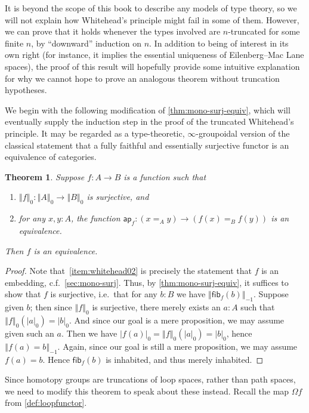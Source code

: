 \documentclass[10pt,a4paper]{article}
\providecommand{\index}[1]{}
\newcommand{\id}[3][]{\ensuremath{#2 =_{#1} #3}\xspace}
\newcommand{\mapfunc}[1]{\ensuremath{\mathsf{ap}_{#1}}\xspace} %
\let\apfunc\mapfunc
\newcommand{\hfib}[2]{{\mathsf{fib}}_{#1}(#2)}
\newcommand{\trunc}[2]{\mathopen{}\left\Vert #2\right\Vert_{#1}\mathclose{}}
\newcommand{\tproj}[3][]{\mathopen{}\left|#3\right|_{#2}^{#1}\mathclose{}}
\newtheorem{thm}{Theorem}[section]
\theoremstyle{definition}
\theoremstyle{remark}
\numberwithin{equation}{section}
\begin{document}
It is beyond the scope of this book to describe any models of type theory, so we will not explain how Whitehead's principle might fail in some of them.
However, we can prove that it holds whenever the types involved are $n$-truncated for some finite $n$, by ``downward'' induction on $n$.
In addition to being of interest in its own right (for instance, it implies the essential uniqueness of Eilenberg--Mac Lane spaces), the proof of this result will hopefully provide some intuitive explanation for why we cannot hope to prove an analogous theorem without truncation hypotheses.

We begin with the following modification of \cref{thm:mono-surj-equiv}, which will eventually supply the induction step in the proof of the truncated Whitehead's principle.
It may be regarded as a type-theoretic, $\infty$-group\-oid\-al version of the classical statement that a fully faithful and essentially surjective functor is an equivalence of categories.

\begin{thm}\label{thm:whitehead0}
  Suppose $f:A\to B$ is a function such that
  \begin{enumerate}
  \item $\trunc0 f : \trunc0 A \to \trunc0 B$ is surjective, and\label{item:whitehead01}
  \item for any $x,y:A$, the function $\apfunc f : (\id[A]xy) \to (\id[B]{f(x)}{f(y)})$ is an equivalence.\label{item:whitehead02}
  \end{enumerate}
  Then $f$ is an equivalence.
\end{thm}
\begin{proof}
  Note that~\ref{item:whitehead02} is precisely the statement that $f$ is an embedding, c.f.~\cref{sec:mono-surj}.
  Thus, by \cref{thm:mono-surj-equiv}, it suffices to show that $f$ is surjective, i.e.\ that for any $b:B$ we have $\trunc{-1}{\hfib f b}$.
  Suppose given $b$; then since $\trunc0 f$ is surjective, there merely exists an $a:A$ such that $\trunc 0 f(\tproj0a) = \tproj0b$.
  And since our goal is a mere proposition, we may assume given such an $a$.
  Then we have $\tproj0{f(a)} = \trunc 0 f(\tproj0a) =\tproj0b$, hence $\trunc{-1}{f(a)=b}$.
  Again, since our goal is still a mere proposition, we may assume $f(a)=b$.
  Hence $\hfib f b$ is inhabited, and thus merely inhabited.
\end{proof}

Since homotopy groups are truncations of loop spaces\index{loop space}, rather than path spaces, we need to modify this theorem to speak about these instead. Recall the map $\Omega f$ from \cref{def:loopfunctor}.
\end{document}
